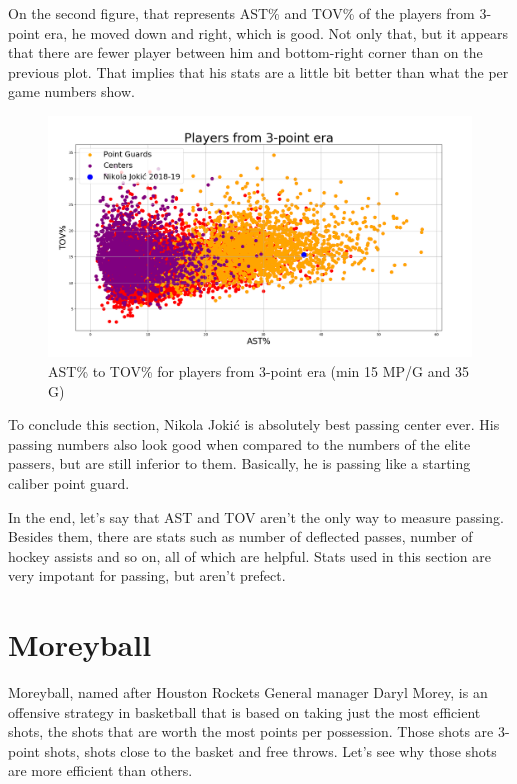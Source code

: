 \documentclass[a4paper]{article}
\begin{document}
On the second figure, that represents AST\% and TOV\% of the players from 3-point era, he moved down and right, which is good. Not only that, but it appears that there are fewer player between him and bottom-right corner than on the previous plot. That implies that his stats are a little bit better than what the per game numbers show.

\begin{figure}[h!]
\begin{center}
\includegraphics[scale=0.30]{ast_tov_pct_3point_era.png}
\end{center}
\caption{AST\% to TOV\% for players from 3-point era (min 15 MP/G and 35 G)}
\label{plt:ast_tov_pct_3p}
\end{figure}

To conclude this section, Nikola Joki\' c is absolutely best passing center ever. His passing numbers also look good when compared to the numbers of the elite passers, but are still inferior to them. Basically, he is passing like a starting caliber point guard.

In the end, let's say that AST and TOV aren't the only way to measure passing. Besides them, there are stats such as number of deflected passes, number of hockey assists and so on, all of which are helpful. Stats used in this section are very impotant for passing, but aren't prefect.

\pagebreak

\section{Moreyball}
\label{sec:moreyball}

Moreyball, named after Houston Rockets General manager Daryl Morey, is an offensive strategy in basketball that is based on taking just the most efficient shots, the shots that are worth the most points per possession. Those shots are 3-point shots, shots close to the basket and free throws. Let's see why those shots are more efficient than others.
\end{document}
